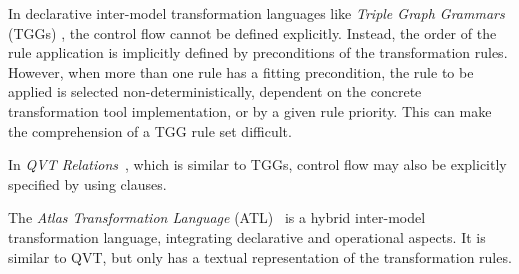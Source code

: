 In declarative inter-model transformation languages like \emph{Triple Graph Grammars} (TGGs) \cite{Sch94}, the control flow cannot be defined explicitly.
Instead, the order of the rule application is implicitly defined by preconditions of the transformation rules.
However, when more than one rule has a fitting precondition, the rule to be applied is selected non-deterministically, dependent on the concrete transformation tool implementation, or by a given rule priority.
This can make the comprehension of a TGG rule set difficult.

In \emph{QVT Relations}~\cite{QVT}, which is similar to TGGs, control flow may also be explicitly specified by using  clauses.

The \emph{Atlas Transformation Language} (ATL)~\cite{ATL} is a hybrid inter-model transformation language, integrating declarative and operational aspects.
It is similar to QVT, but only has a textual representation of the transformation rules.

